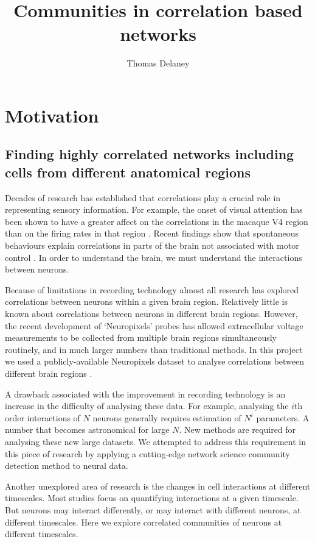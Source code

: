 \documentclass[a4paper,12pt]{article}
\title{Communities in correlation based networks}
\author{Thomas Delaney}
\theoremstyle{definition}
\begin{document}
\tableofcontents

\newpage

\section{Motivation}
    \subsection{Finding highly correlated networks including cells from different anatomical regions}
    Decades of research has established that correlations play a crucial role in representing sensory information. For example, the onset of visual attention has been shown to have a greater affect on the correlations in the macaque V4 region than on the firing rates in that region \cite{cohen1}. Recent findings show that spontaneous behaviours explain correlations in parts of the brain not associated with motor control \cite{stringer}. In order to understand the brain, we must understand the interactions between neurons. 

    Because of limitations in recording technology almost all research has explored correlations between neurons within a given brain region. Relatively little is known about correlations between neurons in different brain regions. However, the recent development of `Neuropixels' probes \cite{jun} has allowed extracellular voltage measurements to be collected from multiple brain regions simultaneously routinely, and in much larger numbers than traditional methods. In this project we used a publicly-available Neuropixels dataset to analyse correlations between different brain regions \cite{stringer}.

    A drawback associated with the improvement in recording technology is an increase in the difficulty of analysing these data. For example, analysing the $i$th order interactions of $N$ neurons generally requires estimation of $N^i$ parameters. A number that becomes astronomical for large $N$. New methods are required for analysing these new large datasets. We attempted to address this requirement in this piece of research by applying a cutting-edge network science community detection method to neural data.

    Another unexplored area of research is the changes in cell interactions at different timescales. Most studies focus on quantifying interactions at a given timescale. But neurons may interact differently, or may interact with different neurons, at different timescales. Here we explore correlated communities of neurons at different timescales.
\end{document}
